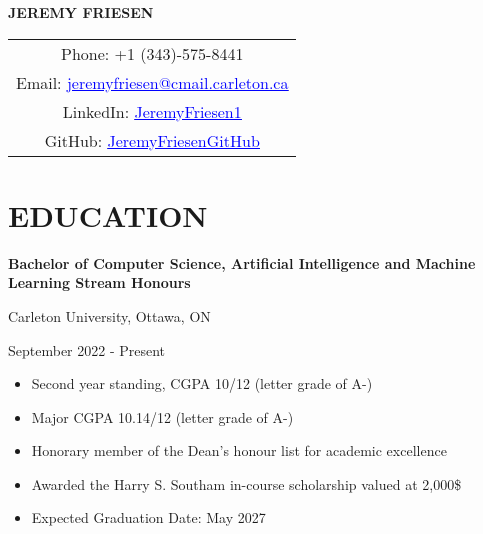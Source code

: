 \documentclass[a4paper,11pt]{article}
\begin{document}


\begin{center}
    {\Large\bfseries JEREMY FRIESEN}
\end{center}


\begin{center}
    \begin{tabular}{c}
        Phone: +1 (343)-575-8441 \\
        Email: \href{mailto:jeremyfriesen@cmail.carleton.ca}{\textcolor{blue}{\uline{jeremyfriesen@cmail.carleton.ca}}} \\
        LinkedIn: \href{https://www.linkedin.com/in/jeremyfriesen1/}{\textcolor{blue}{\uline{JeremyFriesen1}}} \\
        GitHub: \href{https://github.com/JeremyFriesenGitHub}{\textcolor{blue}{\uline{JeremyFriesenGitHub}}}
    \end{tabular}
\end{center}



\section{EDUCATION}
 \begin{minipage}{\linewidth}
    \textbf{Bachelor of Computer Science, Artificial Intelligence and Machine Learning Stream Honours}
\end{minipage}
    \begin{minipage}{.65\linewidth}
    \begin{flushleft}
        Carleton University, Ottawa, ON
    \end{flushleft}
\end{minipage}
\hfill
\begin{minipage}{.30\linewidth}
    \begin{flushright}
        September 2022 - Present
    \end{flushright}
\end{minipage}
\begin{itemize}
    \item Second year standing, CGPA 10/12 (letter grade of A-) 
    \item Major CGPA 10.14/12 (letter grade of A-)
    \item Honorary member of the Dean’s honour list for academic excellence
    \item Awarded the Harry S. Southam in-course scholarship valued at 2,000\$  
    \item Expected Graduation Date: May 2027 
\end{itemize}
	  	 
\end{document}
